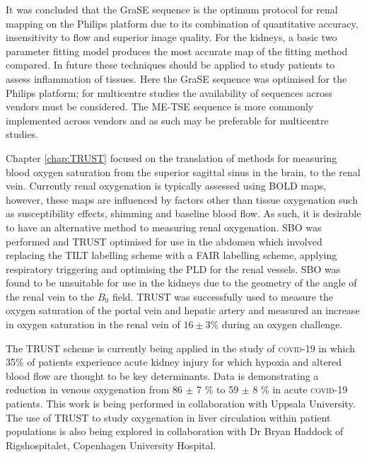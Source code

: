 It was concluded that the \ac{GraSE} sequence is the optimum protocol for renal \ttwo mapping on the Philips platform due to its combination of quantitative accuracy, insensitivity to flow and superior image quality. For the kidneys, a basic two parameter fitting model produces the most accurate \ttwo map of the fitting method compared. In future these techniques should be applied to study patients to assess inflammation of tissues. Here the \ac{GraSE} sequence was optimised for the Philips platform; for multicentre studies the availability of sequences across vendors must be considered. The \ac{ME-TSE} sequence is more commonly implemented across vendors and as such may be preferable for multicentre studies.

Chapter \ref{chap:TRUST} focused on the translation of methods for measuring blood oxygen saturation from the superior sagittal sinus in the brain, to the renal vein. Currently renal oxygenation is typically assessed using \ac{BOLD} \ttwostar maps, however, these maps are influenced by factors other than tissue oxygenation such as susceptibility effects, shimming and baseline blood flow. As such, it is desirable to have an alternative method to measuring renal oxygenation. \ac{SBO} was performed and \ac{TRUST} optimised for use in the abdomen which involved replacing the \ac{TILT} labelling scheme with a \ac{FAIR} labelling scheme, applying respiratory triggering and optimising the \ac{PLD} for the renal vessels. \ac{SBO} was found to be unsuitable for use in the kidneys due to the geometry of the angle of the renal vein to the $B_0$ field. \ac{TRUST} was successfully used to measure the oxygen saturation of the portal vein and hepatic artery and measured an increase in oxygen saturation in the renal vein of $16 \pm 3 \%$ during an oxygen challenge.

The \ac{TRUST} scheme is currently being applied in the study of \textsc{covid}-19 in which 35\% of patients experience acute kidney injury for which hypoxia and altered blood flow are thought to be key determinants. Data is demonstrating a reduction in venous oxygenation from 86 $\pm$ 7 \% to 59 $\pm$ 8 \% in acute \textsc{covid}-19 patients. This work is being performed in collaboration with Uppsala University. The use of \ac{TRUST} to study oxygenation in liver circulation within patient populations is also being explored in collaboration with Dr Bryan Haddock of Rigshospitalet, Copenhagen University Hospital.

